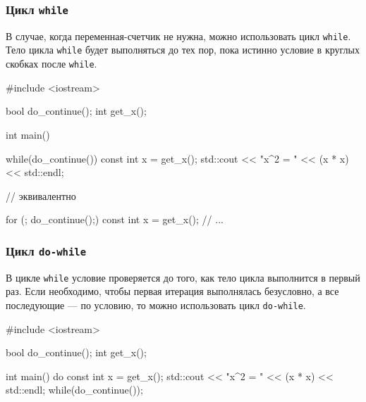 \documentclass[compress, 8pt, aspectratio=169]{beamer}
\begin{document}
\begin{frame}[fragile]

    \frametitle{Цикл \texttt{while}}

    \hfill \break

    В случае, когда переменная-счетчик не нужна, можно
    использовать цикл \verb|while|.
    Тело цикла \verb|while| будет выполняться до тех пор, пока истинно
    условие в круглых скобках после \verb|while|.

    \begin{myinplacelisting}[%
        minted language=cpp,
        minted options={
            fontsize=\footnotesize,
            breaklines,
            breakanywhere,
            linenos,
            escapeinside=||,
            numbersep=2pt
        },
    ]
#include <iostream>

bool do_continue();
int get_x();

int main() {
    while(do_continue()) {
        const int x = get_x();
        std::cout << "x^2 = " << (x * x) << std::endl;
    }

    // эквивалентно

    for (; do_continue();) {
        const int x = get_x();
        // ...
    }
}
    \end{myinplacelisting}

\end{frame}

\begin{frame}[fragile]

    \frametitle{Цикл \texttt{do-while}}

    В цикле \verb|while| условие проверяется до того, как тело цикла
    выполнится в первый раз.
    Если необходимо, чтобы первая итерация выполнялась безусловно, а
    все последующие — по условию, то можно использовать цикл
    \verb|do-while|.

    \begin{myinplacelisting}[minted language=cpp]
#include <iostream>

bool do_continue();
int get_x();

int main() {
    do {
        const int x = get_x();
        std::cout << "x^2 = " << (x * x) << std::endl;
    } while(do_continue());
}
    \end{myinplacelisting}

\end{frame}
\end{document}
